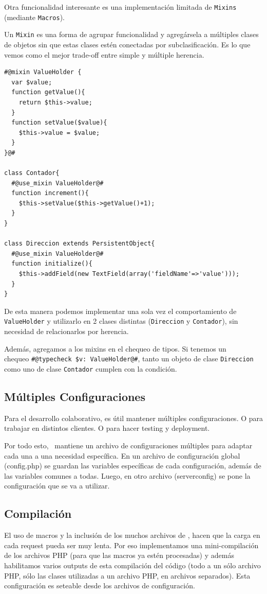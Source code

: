 
Otra funcionalidad interesante es una implementación limitada de \verb"Mixins" (mediante \verb"Macros").

Un \verb"Mixin" es una forma de agrupar funcionalidad y agregársela a múltiples clases de objetos sin que estas clases estén conectadas por subclasificación. Es lo que vemos como el mejor trade-off entre simple y múltiple herencia.

\begin{verbatim}
#@mixin ValueHolder {
  var $value;
  function getValue(){
    return $this->value;
  }
  function setValue($value){
    $this->value = $value;
  }
}@#

class Contador{
  #@use_mixin ValueHolder@#
  function increment(){
    $this->setValue($this->getValue()+1);
  }
}

class Direccion extends PersistentObject{
  #@use_mixin ValueHolder@#
  function initialize(){
    $this->addField(new TextField(array('fieldName'=>'value')));
  }
}

\end{verbatim}

De esta manera podemos implementar una sola vez el comportamiento de \verb'ValueHolder' y utilizarlo en 2 clases distintas (\verb"Direccion" y \verb"Contador"), sin necesidad de relacionarlos por herencia.

Además, agregamos a los mixins en el chequeo de tipos. Si tenemos un \\ chequeo \verb"#@typecheck $v: ValueHolder@#", tanto un objeto de clase \verb"Direccion" como uno de clase \verb"Contador" cumplen con la condición.

\subsection{Múltiples Configuraciones}
\label{sub-config}
Para el desarrollo colaborativo, es útil mantener múltiples configuraciones. O para trabajar en distintos clientes. O para hacer testing y deployment.

Por todo esto, \PWB \ mantiene un archivo de configuraciones múltiples para adaptar cada una a una necesidad específica. En un archivo de configuración global (config.php) se guardan las variables específicas de cada configuración, además de las variables comunes a todas. Luego, en otro archivo (serverconfig) se pone la configuración que se va a utilizar.

\subsection{Compilación}

El uso de macros y la inclusión de los muchos archivos de \PWB, hacen que la carga en cada request pueda ser muy lenta. Por eso implementamos una mini-compilación de los archivos PHP (para que las macros ya estén procesadas) y además habilitamos varios outputs de esta compilación del código (todo a un sólo archivo PHP, sólo las clases utilizadas a un archivo PHP, en archivos separados). Esta configuración es seteable desde los archivos de configuración.
